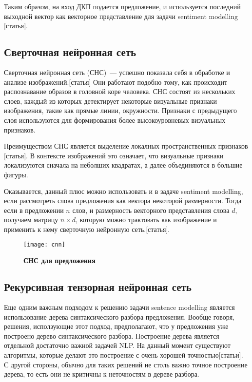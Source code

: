 Таким образом, на вход ДКП подается предложение, и используется последний выходной вектор как векторное представление для задачи sentiment modelling [статья].

\subsection{Сверточная нейронная сеть}
Сверточная нейронная сеть (СНС)~--- успешно показала себя в обработке и анализе изображений.[статья] Они работают подобно тому, как происходит распознавание образов в головной коре человека. СНС состоят из нескольких слоев, каждый из которых детектирует некоторые визуальные признаки изображения, такие как прямые линии, окружности. Признаки с предыдущего слоя используются для формирования более высокоуровневых визуальных признаков.

Преимуществом СНС является выделение локалных пространственных признаков [статья]. В контексте изображений это означает, что визуальные признаки локализуются сначала на неболших квадратах, а далее объединяются в большие фигуры.

Оказывается, данный плюс можно использовать и в задаче sentiment modelling, если рассмотреть слова предложения как вектора некоторой размерности. Тогда если в предложении $n$ слов, 
и размерность векторного представления слова $d$, получаем матрицу $n \times d$, 
которую можно трактовать как изображение и применить к нему сверточную нейронную сеть.[статья].

\begin{figure}[h]
\texttt{[image: cnn]}
\caption{\textbf{СНС для предложения}}
\label{fig:cnn}
\end{figure}

\subsection{Рекурсивная тензорная нейронная сеть}
Еще одним важным подходом к решению задачи sentence modelling является использование 
дерева синтаксического разбора предложения. Вообще говоря, решения, исползующие этот подход, предполагают, что у предложения уже построено дерево синтаксического разбора. Построение дерева является отдельной достаточно важной задачей NLP. На данный момент существуют алгоритмы, которые делают это построение с очень хорошей точностью[статьи]. 
С другой стороны, обычно для таких решений не столь важно точное построение дерева, то есть они не критичны к неточностям в дереве разбора.

